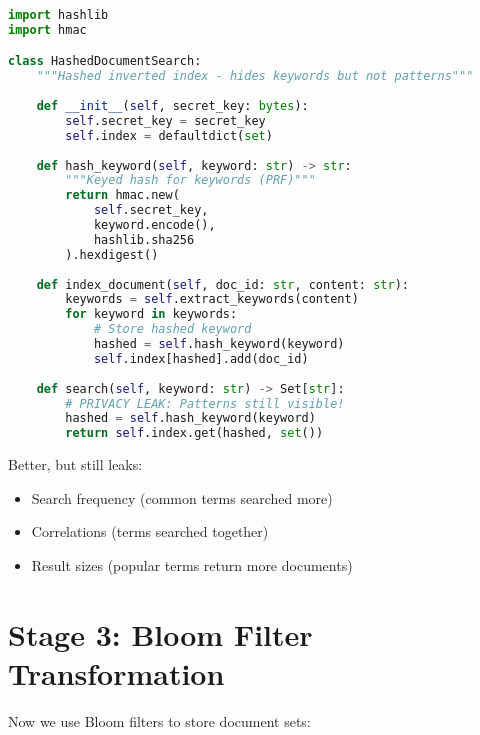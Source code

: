 \begin{lstlisting}[language=Python, caption={Hashed keywords - still not private}]
import hashlib
import hmac

class HashedDocumentSearch:
    """Hashed inverted index - hides keywords but not patterns"""
    
    def __init__(self, secret_key: bytes):
        self.secret_key = secret_key
        self.index = defaultdict(set)
    
    def hash_keyword(self, keyword: str) -> str:
        """Keyed hash for keywords (PRF)"""
        return hmac.new(
            self.secret_key,
            keyword.encode(),
            hashlib.sha256
        ).hexdigest()
    
    def index_document(self, doc_id: str, content: str):
        keywords = self.extract_keywords(content)
        for keyword in keywords:
            # Store hashed keyword
            hashed = self.hash_keyword(keyword)
            self.index[hashed].add(doc_id)
    
    def search(self, keyword: str) -> Set[str]:
        # PRIVACY LEAK: Patterns still visible!
        hashed = self.hash_keyword(keyword)
        return self.index.get(hashed, set())
\end{lstlisting}

Better, but still leaks:
\begin{itemize}
\item Search frequency (common terms searched more)
\item Correlations (terms searched together)
\item Result sizes (popular terms return more documents)
\end{itemize}

\section{Stage 3: Bloom Filter Transformation}

Now we use Bloom filters to store document sets:

